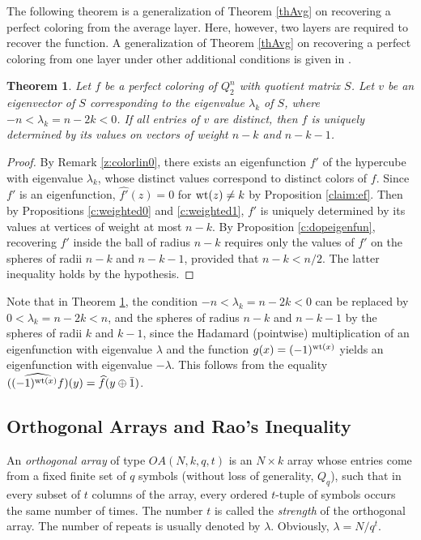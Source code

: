 \documentclass[11pt]{article}
\newtheorem{theorem}{Theorem}[section]
\theoremstyle{definition}
\newcommand{\wt}{{\rm wt}}
\begin{document}
{{{The following theorem is a generalization of Theorem \ref{thAvg}
on recovering a perfect coloring from the average layer. Here, however,
two layers are required to recover the function. A generalization
of Theorem \ref{thAvg} on recovering a perfect coloring from one
layer under other additional conditions is given in \cite{Vas12}.

\begin{theorem}\label{th:2level}
Let $f$ be a perfect coloring of  $Q^n_2$ with
quotient matrix $S$. Let $v$ be an eigenvector of $S$
corresponding to the eigenvalue $\lambda_k$ of $S$,
where $-n<\lambda_k=n-2k<0$. If all entries of  $v$
are distinct, then $f$ is uniquely determined by its values on
vectors of weight $n-k$ and $n-k-1$.
\end{theorem}
\begin{proof}
By Remark \ref{z:colorlin0}, there exists an eigenfunction $f'$
of the hypercube with eigenvalue $\lambda_k$, whose distinct values
correspond to distinct colors of $f$. Since $f'$ is an
eigenfunction, $\widehat{f'}(z)=0$ for $\wt(z)\neq k$ by
Proposition \ref{claim:ef}. Then by Propositions \ref{c:weighted0}
and \ref{c:weighted1}, $f'$ is uniquely determined by its
values at vertices of weight at most $n-k$. By Proposition
\ref{c:dopeigenfun}, recovering $f'$ inside the ball of radius
$n-k$ requires only the values of $f'$ on the spheres of radii $n-k$ and
$n-k-1$, provided that $n-k<n/2$. The latter inequality holds by the
hypothesis.
\end{proof}

Note that in Theorem \ref{th:2level}, the condition $-n<\lambda_k=n-2k<0$
can be replaced by $0<\lambda_k=n-2k<n$, and the spheres of radius
$n-k$ and $n-k-1$ by the spheres of radii $k$ and $k-1$, since
the Hadamard (pointwise) multiplication of an eigenfunction with eigenvalue
$\lambda$  and the function $g(x)=(-1)^{\wt(x)}$ yields an eigenfunction with eigenvalue
$-\lambda$. This follows from the equality
$\widehat{((-1)^{\wt(x)}f)}(y)=\widehat{f}(y\oplus \bar 1)$.

\subsection{Orthogonal Arrays and Rao's Inequality}

An {\sl orthogonal array} of type $OA(N, k, q, t)$  is an $N\times k$ array whose entries come from a fixed finite set of $q$ symbols (without loss of generality,  $Q_q$),   such that in every subset of $t$ columns of the array, every ordered $t$-tuple of symbols  occurs the same number of times. The number $t$ is called the {\sl strength} of the orthogonal array. The number of repeats is usually denoted by $\lambda$. Obviously, $\lambda=N/q^t$.

}}}
\end{document}
